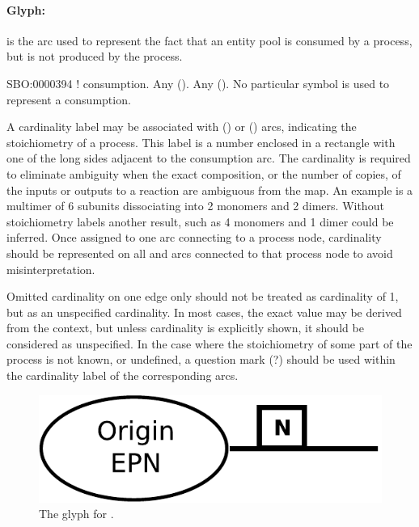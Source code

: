 

\paragraph{Glyph: }
\label{sec:consumption}

 is the arc used to represent the fact that an entity pool is consumed by a process,
but is not produced by the process.

\begin{glyphDescription}
 \glyphSboTerm SBO:0000394 ! consumption.
 \glyphOrigin Any  ().
 \glyphTarget Any  ().
 \glyphEndPoint No particular symbol is used to represent a consumption.
\end{glyphDescription}


A cardinality label may be associated with  () or 
 () arcs, indicating the stoichiometry of a process. This label is a number enclosed in a rectangle with one of the long sides adjacent to the consumption arc. The cardinality is 
required to eliminate ambiguity when the exact composition, or the number of 
copies, of the inputs or outputs to a reaction are ambiguous from the map. 
An example is a multimer of 6 subunits dissociating into 2 monomers and 2 
dimers. Without stoichiometry labels another result, such as 4 monomers and 1 
dimer could be inferred.
Once assigned to one arc connecting to a process node, cardinality should be represented on
all  and  arcs connected to that process
node to avoid misinterpretation.

Omitted cardinality on one edge only should not be treated as cardinality of 1, but
as an unspecified cardinality. In most cases, the exact value may be derived from the
context, but unless cardinality is explicitly shown, it should be considered as
unspecified. In the case where the stoichiometry of some part of the process is not
known, or undefined, a question mark (?) should be used within the cardinality label
of the corresponding arcs.

\begin{figure}[H]
  \centering
  \includegraphics[scale = 0.4]{images/consumption}
  \caption{The \PD glyph for .}
  \label{fig:consumption}
\end{figure}




